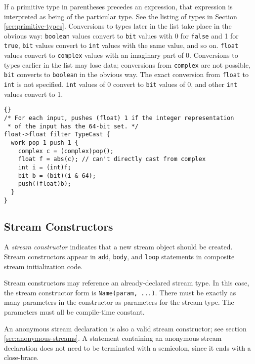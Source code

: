\documentclass[11pt]{article}
\begin{document}
If a primitive type in parentheses precedes an expression, that
expression is interpreted as being of the particular type.  See the
listing of types in Section \ref{sec:primitive-types}.  Conversions to
types later in the list take place in the obvious way:
\lstinline|boolean| values convert to \lstinline|bit| values with 0
for \lstinline|false| and 1 for \lstinline|true|, \lstinline|bit|
values convert to \lstinline|int| values with the same value, and so
on.  \lstinline|float| values convert to \lstinline|complex| values
with an imaginary part of 0.  Conversions to types earlier in the list
may lose data; conversions from \lstinline|complex| are not possible,
\lstinline|bit| converts to \lstinline|boolean| in the obvious way.
The exact conversion from \lstinline|float| to \lstinline|int| is not
specified.  \lstinline|int| values of 0 convert to \lstinline|bit|
values of 0, and other \lstinline|int| values convert to 1.

\begin{lstlisting}{}
/* For each input, pushes (float) 1 if the integer representation
 * of the input has the 64-bit set. */
float->float filter TypeCast {
  work pop 1 push 1 {
    complex c = (complex)pop();
    float f = abs(c); // can't directly cast from complex
    int i = (int)f;
    bit b = (bit)(i & 64);
    push((float)b);
  }
}
\end{lstlisting}

\subsection{Stream Constructors}
\label{sec:expr-stream-constructor}

A \emph{stream constructor} indicates that a new stream object should
be created.  Stream constructors appear in \lstinline|add|,
\lstinline|body|, and \lstinline|loop| statements in composite stream
initialization code.

Stream constructors may reference an already-declared stream type.  In
this case, the stream constructor form is \lstinline|Name(param, ...)|.
There must be exactly as many parameters in the constructor as
parameters for the stream type.  The parameters must all be
compile-time constant.

An anonymous stream declaration is also a valid stream constructor;
see section \ref{sec:anonymous-streams}.  A statement containing an
anonymous stream declaration does not need to be terminated with a
semicolon, since it ends with a close-brace.
\end{document}
